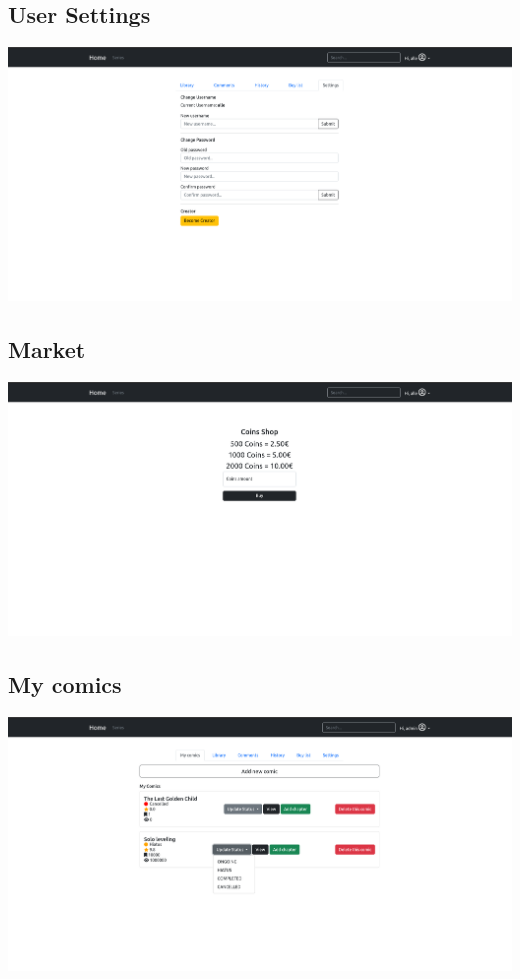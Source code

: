 \subsection{User Settings}
\includegraphics[width=1.0\linewidth]{images/user-settings.png}

\subsection{Market}
\includegraphics[width=1.0\linewidth]{images/market.png}

\subsection{My comics}
\includegraphics[width=1.0\linewidth]{images/my-comics.png}

